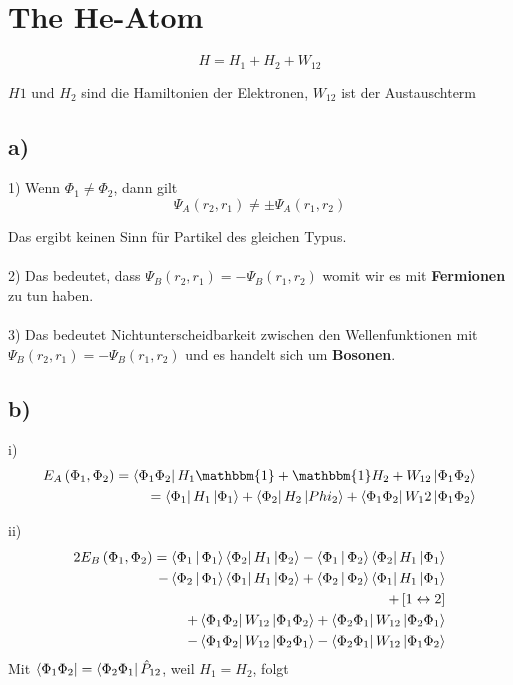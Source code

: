 \section{The He-Atom}

\begin{equation}
H = H_1 + H_2 + W_{12}
\end{equation}

$H1$ und $H_2$ sind die Hamiltonien der Elektronen, $W_{12}$ ist der Austauschterm

\subsection{a)}

1) Wenn $\Phi_1 \neq \Phi_2$, dann gilt
\begin{equation}
\Psi_A \left( r_2, r_1 \right) \neq \pm \Psi_A \left(r_1, r_2 \right)
\end{equation}

Das ergibt keinen Sinn f\"ur Partikel des gleichen Typus.\\
 \\
2) Das bedeutet, dass $\Psi_B \left( r_2, r_1 \right) = - \Psi_B \left( r_1, r_2 \right)$ womit wir es mit \textbf{Fermionen} zu tun haben.\\
 \\
3) Das bedeutet Nichtunterscheidbarkeit zwischen den Wellenfunktionen mit $\Psi_B \left( r_2, r_1 \right) = - \Psi_B \left( r_1, r_2 \right)$ und es handelt sich um \textbf{Bosonen}.

\subsection{b)}

i)
\begin{align}
E_A \left( \Phi_1 , \Phi_2 \right) = \Bra{\Phi_1 \Phi_2} H_1 \mathbbm{1} + \mathbbm{1} H_2 + W_{12} \Ket{\Phi_1 \Phi_2} \\
= \Bra{\Phi_1} H_1 \Ket{\Phi_1} + \Bra{\Phi_2} H_2 \Ket{Phi_2} + \Bra{\Phi_1 \Phi_2} W_12 \Ket{\Phi_1 \Phi_2}
\end{align}

ii)
\begin{align}
2 E_B \left( \Phi_1 , \Phi_2 \right) = 
\Braket{\Phi_1|\Phi_1}  \Bra{\Phi_2} H_1 \Ket{\Phi_2} - \Braket{\Phi_1|\Phi_2}  \Bra{\Phi_2} H_1 \Ket{\Phi_1} \\
- \Braket{\Phi_2|\Phi_1}  \Bra{\Phi_1} H_1 \Ket{\Phi_2} + \Braket{\Phi_2|\Phi_2}  \Bra{\Phi_1} H_1 \Ket{\Phi_1} \\
+ \left[1 \leftrightarrow 2 \right] \\
+ \Bra{\Phi_1 \Phi_2} W_{12} \Ket{\Phi_1 \Phi_2} + \Bra{\Phi_2 \Phi_1} W_{12} \Ket{\Phi_2 \Phi_1} \\
- \Bra{\Phi_1 \Phi_2} W_{12} \Ket{\Phi_2 \Phi_1} - \Bra{\Phi_2 \Phi_1} W_{12} \Ket{\Phi_1 \Phi_2}
\end{align}
Mit $\Bra{\Phi_1 \Phi_2} = \Bra{\Phi_2 \Phi_1} \hat{P}_{12}$, weil $H_1 = H_2$, folgt

